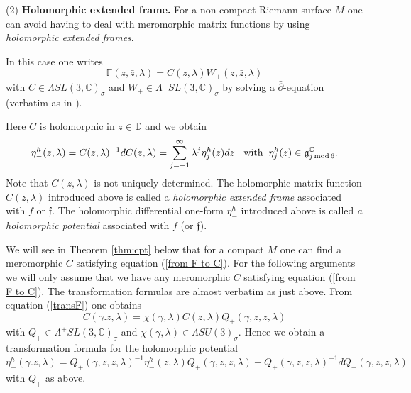 \documentclass[a4paper,11pt]{amsart}
\theoremstyle{definition}
\numberwithin{equation}{section}
\newcommand{\C}{\mathbb{C}}
\newcommand{\F}{\mathbb{F}}
\newcommand{\f}{\mathfrak{f}}
\begin{document}
(2) \textbf{Holomorphic  extended frame.} 
 For a non-compact Riemann surface $M$ one can  avoid having to deal with meromorphic  matrix functions by  using \emph{holomorphic  extended frames}.

In this case one writes 
\begin{equation} \label{from F to C} 
\F(z, \bar z, \lambda) = C(z,\lambda) W_+(z, \bar z, \lambda)
\end{equation}
with $C\in \Lambda SL(3,\C)_{\sigma}$ and $W_+\in \Lambda^+SL(3,\C)_{\sigma}$
by solving a $\bar{\partial}$-equation  (verbatim as in \cite{DPW}).

Here $C$ is holomorphic in $ z \in  \mathbb{D}$  and we obtain
\begin{equation}
\eta^h_-(z, \lambda) = C(z,\lambda)^{-1} dC(z, \lambda ) = \sum_{j=-1}^{\infty}
 \lambda^j \eta^h_j (z) dz \hspace{2mm} \mbox{ with} \hspace{2mm} \eta^h_j (z) \in \mathfrak{g}^\C_{j\,{\mathrm{mod}}\, 6}.
\end{equation}
Note that $C(z, \lambda)$ is not uniquely determined.
The holomorphic matrix function $C(z, \lambda)$ introduced above is 
called a  \emph{holomorphic extended frame} associated with $f$ or $\f$.
The holomorphic  differential one-form $\eta^h_-$ introduced above is
called  \emph{a holomorphic potential} associated with $f$ (or $\f$).

 We will see in Theorem \ref{thm:cpt}  below  that for a compact $M$ one can find a meromorphic $C$ satisfying equation (\ref{from F to C}). 
For the following arguments we will only assume that we have any 
meromorphic $C$ satisfying equation (\ref{from F to C}).
The transformation formulas are almost verbatim as just above. From equation (\ref{transF}) one obtains
\begin{equation} \label{transC}
C(\gamma.z, \lambda) = \chi(\gamma,\lambda) C(z, \lambda) Q_+(\gamma, z, \bar z, \lambda)
\end{equation}
with  $Q_+ \in \Lambda^{+} SL(3,\C)_\sigma$
and $\chi(\gamma,\lambda) \in \Lambda SU(3)_{\sigma}$. Hence we obtain a transformation formula for the holomorphic potential
\begin{equation} \label{transeta}
\eta^h_-(\gamma.z, \lambda) =  Q_+(\gamma, z, \bar z, \lambda)^{-1} \eta^h_-(z, \lambda) Q_+(\gamma, z, \bar z, \lambda) + Q_+(\gamma, z, \bar z, \lambda)^{-1} dQ_+(\gamma, z, \bar z, \lambda)
\end{equation}
with  $Q_+$ as above.
\end{document}
